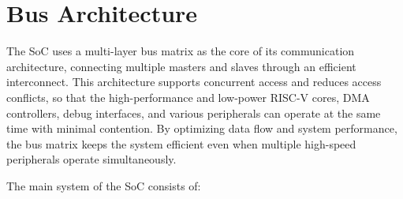 \documentclass[main\_\_EN.tex]{subfiles}
\begin{document}
\setenglishformatting

\ifglobal
\else
    \clearpage
    \listoftodos
    \listofdonetodos
    \tableofcontents
\fi



\hypertarget{busarch}{}
\chapter{Bus Architecture}
\label{mod:busarch}

The \chipname{} SoC uses a multi-layer bus matrix as the core of its communication architecture, connecting multiple masters and slaves through an efficient interconnect. This architecture supports concurrent access and reduces access conflicts, so that the high-performance and low-power RISC-V cores, DMA controllers, debug interfaces, and various peripherals can operate at the same time with minimal contention. By optimizing data flow and system performance, the bus matrix keeps the system efficient even when multiple high-speed peripherals operate simultaneously.

The main system of the \chipname{} SoC consists of:
\end{document}
